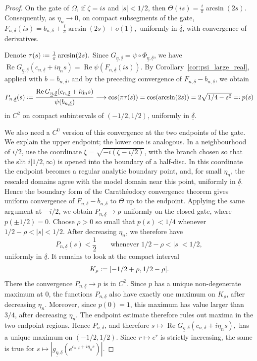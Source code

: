 \documentclass[a4paper, 11pt, reqno]{amsart}
\numberwithin{equation}{section}
\theoremstyle{plain}
\newcommand*{\defeq}{\mathrel{\vcenter{\baselineskip0.5ex \lineskiplimit0pt
 \hbox{\scriptsize.}\hbox{\scriptsize.}}}=}
\newcommand{\eqdef}{=\mathrel{\vcenter{\baselineskip0.5ex \lineskiplimit0pt
	\hbox{\scriptsize.}\hbox{\scriptsize.}}}}
\theoremstyle{remark}
\newcommand{\uldelta}{\underline{\delta}}
\newcommand{\uleta}{\underline{\eta}}
\newcommand{\Rea}{\operatorname{Re }}
\begin{document}
\begin{proof}
	On the gate of \(\Omega\), if \(\zeta=is\) and \(|s|<1/2\), then
	$
	\Theta(is)
	=
	\frac{i}{\pi}\arcsin(2s).
	$
	Consequently, as \(\eta_n\to0\), on compact subsegments of the gate,
	$
	F_{n,\uldelta}(is)
	=
	b_{n,\uldelta}
	+
	\frac{i}{\pi}\arcsin(2s)
	+ o(1),
	$
	uniformly in \(\uldelta\), with convergence of derivatives.
	
	Denote
	$
	\tau(s)\defeq \frac1\pi\arcsin(2s).
	$
	Since \(G_{\uleta,\uldelta}=\psi\circ\Phi_{\uleta,\uldelta}\), we have
	$
	\Rea G_{\uleta,\uldelta}(c_{n,\uldelta}+i\eta_ns)
	=
	\Rea \psi(F_{n,\uldelta}(is)).
	$
	By Corollary~\ref{cor:psi_large_real}, applied with
	\(b=b_{n,\uldelta}\), and by the preceding convergence of
	\(F_{n,\uldelta}-b_{n,\uldelta}\), we obtain
	\[
	P_{n,\uldelta}(s)
	\defeq
	\frac{
		\Rea G_{\uleta,\uldelta}(c_{n,\uldelta}+i\eta_ns)
	}{
		\psi(b_{n,\uldelta})
	}
	\longrightarrow
	\cos(\pi\tau(s))=
	\cos(\arcsin(2s))
	=
	2\sqrt{1/4-s^2}\eqdef	p(s)
	\]
	in \(C^2\) on compact subintervals of \((-1/2,1/2)\), uniformly in
	\(\uldelta\).

We also need a \(C^0\) version of this convergence at the two endpoints of
		the gate. 	We explain the upper endpoint; the lower one is analogous. In a
		neighbourhood of \(i/2\), use the coordinate
		\(\xi=\sqrt{-i(\zeta-i/2)}\), with the branch chosen so that the slit
		\(i[1/2,\infty)\) is opened into the boundary of a half-disc. In this
		coordinate the endpoint becomes a regular analytic boundary point, and, for
		small \(\eta_n\), the rescaled domains agree with the model domain near this
		point, uniformly in \(\uldelta\). Hence the boundary form of the
		Carath\'eodory convergence theorem gives uniform convergence of
		\(F_{n,\uldelta}-b_{n,\uldelta}\) to \(\Theta\) up to the endpoint. Applying
		the same argument at \(-i/2\), we obtain \(P_{n,\uldelta}\to p\) uniformly on
		the closed gate, where \(p(\pm1/2)=0\). Choose \(\rho>0\) so small that
	\(p(s)<1/4\) whenever \(1/2-\rho<|s|<1/2\). After decreasing \(\eta_n\),
	we therefore have
	\[
	P_{n,\uldelta}(s)<\frac12
	\qquad
	\text{whenever }1/2-\rho<|s|<1/2,
	\]
	uniformly in \(\uldelta\). It remains to look at the compact interval
	\[
	K_\rho\defeq[-1/2+\rho,1/2-\rho].
	\]
	There the convergence \(P_{n,\uldelta}\to p\) is in \(C^2\). Since \(p\) has
	a unique non-degenerate maximum at \(0\), the functions
	\(P_{n,\uldelta}\) also have exactly one maximum on \(K_\rho\), after
	decreasing \(\eta_n\). Moreover, since \(p(0)=1\), this maximum has value
	larger than \(3/4\), after decreasing \(\eta_n\). The endpoint estimate
	therefore rules out maxima in the two endpoint regions. Hence
	\(P_{n,\uldelta}\), and therefore
	$
	s\mapsto
	\Rea G_{\uleta,\uldelta}(c_{n,\uldelta}+i\eta_ns),
	$
	has a unique maximum on \((-1/2,1/2)\). Since \(r\mapsto e^r\) is strictly
	increasing, the same is true for
	$
	s\mapsto
	|g_{\uleta,\uldelta}(e^{c_{n,\uldelta}+i\eta_ns})|.
	$
	

\end{proof}
\end{document}
